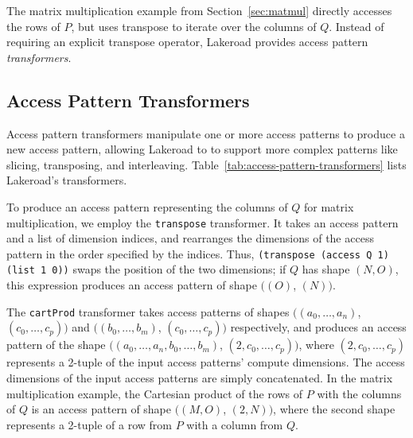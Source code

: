 \documentclass[prologue, dvipsnames, sigplan, screen, review, anonymous]{acmart}
\newcommand{\g}{Lakeroad\xspace}
\newcommand{\accesspatternshape}[2]{$($$\left( #1 \right)$, $\left( #2 \right)$$)$}
\newcommand{\tcd}[1]{\texttt{#1}}
\begin{document}
The matrix multiplication example
  from Section~\ref{sec:matmul}
  directly accesses the rows of $P$,
  but uses transpose to iterate over
  the columns of $Q$.
Instead of requiring an explicit
  transpose operator, \g provides
  access pattern \textit{transformers}.

\subsection{Access Pattern Transformers}

Access pattern transformers 
  manipulate one
  or more access patterns
  to produce a new access pattern,
  allowing \g to
  to support more complex patterns
  like
  slicing,
  transposing,
  and interleaving.
  Table~\ref{tab:access-pattern-transformers}
  lists \g's transformers.
  
To produce an access pattern
  representing
  the columns of $Q$
  for matrix multiplication,
  we employ
  the \texttt{transpose}
  transformer.
It takes an access pattern
  and a list of dimension indices,
  and rearranges
  the dimensions 
  of the access pattern
  in the order specified by the indices.
Thus,
  \texttt{(transpose (access Q 1) (list 1 0))}
  swaps the position
  of the two dimensions;
  if $Q$ has shape $(N, O)$,
  this expression produces
  an access pattern
  of shape
  \accesspatternshape{O}{N}.
  
The \texttt{cartProd} transformer
  takes access patterns
  of shapes
  \accesspatternshape{a_0, \dots, a_n}{c_0, \dots, c_p}
  and 
  \accesspatternshape{b_0, \dots, b_m}{c_0, \dots, c_p}
  respectively, and produces 
  an access pattern of the shape
  \accesspatternshape
    {a_0, \dots, a_n, b_0,\dots, b_m}
    {2, c_0, \dots, c_p},
  where $(2, c_0, \dots, c_p)$
  represents a 2-tuple
  of the input access patterns'
  compute dimensions.
The access dimensions
  of the input access patterns
  are simply concatenated.
In the matrix multiplication example,
  the Cartesian product
  of the rows of $P$
  with the columns of $Q$
  is an access pattern
  of shape
  \accesspatternshape{M,O}{2, N},
  where the second shape
  represents a 2-tuple
  of a row from $P$
  with a column from $Q$.
\end{document}
